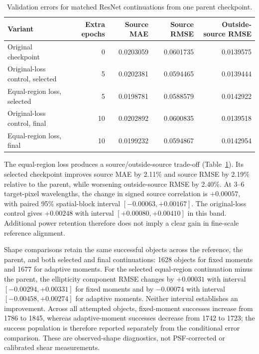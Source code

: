 \begin{table}[t]
    \centering
    \caption{Validation errors for matched ResNet continuations from one parent checkpoint.}
    \label{tab:resnet_continuations}
    \begin{tabular}{lrrrr}
        \hline\hline
        Variant & Extra epochs & Source MAE & Source RMSE & Outside-source RMSE \\
        \hline
        Original checkpoint & 0 & 0.0203059 & 0.0601735 & 0.0139575 \\
        Original-loss control, selected & 5 & 0.0202381 & 0.0594465 & 0.0139444 \\
        Equal-region loss, selected & 5 & 0.0198781 & 0.0588579 & 0.0142922 \\
        Original-loss control, final & 10 & 0.0202892 & 0.0600835 & 0.0139518 \\
        Equal-region loss, final & 10 & 0.0199232 & 0.0594867 & 0.0142954 \\
        \hline
    \end{tabular}
\end{table}

The equal-region loss produces a source/outside-source trade-off (Table~\ref{tab:resnet_continuations}).
Its selected checkpoint improves source MAE by 2.11\% and source RMSE by 2.19\% relative to the parent, while worsening outside-source RMSE by 2.40\%.
At 3--6 target-pixel wavelengths, the change in signed source correlation is $+0.00057$, with paired 95\% spatial-block interval $[-0.00063,+0.00167]$.
The original-loss control gives $+0.00248$ with interval $[+0.00080,+0.00410]$ in this band.
Additional power retention therefore does not imply a clear gain in fine-scale reference alignment.

Shape comparisons retain the same successful objects across the reference, the parent, and both selected and final continuations: 1628 objects for fixed moments and 1677 for adaptive moments.
For the selected equal-region continuation minus the parent, the ellipticity component RMSE changes by $+0.00031$ with interval $[-0.00294,+0.00331]$ for fixed moments and by $-0.00074$ with interval $[-0.00458,+0.00274]$ for adaptive moments.
Neither interval establishes an improvement.
Across all attempted objects, fixed-moment successes increase from 1786 to 1845, whereas adaptive-moment successes decrease from 1742 to 1723; the success population is therefore reported separately from the conditional error comparison.
These are observed-shape diagnostics, not PSF-corrected or calibrated shear measurements.

